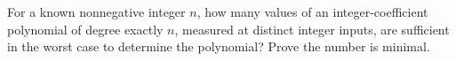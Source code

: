 For a known nonnegative integer $ n $, how many values of an integer-coefficient polynomial of degree exactly $ n $, measured at distinct integer inputs, are sufficient in the worst case to determine the polynomial? Prove the number is minimal.
